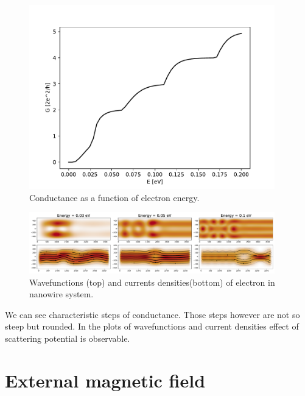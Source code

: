 \documentclass[12pt, a4paper]{article}
\begin{document}
\newpage
\begin{figure}[h]
    \begin{center}
        \includegraphics[width=0.95\textwidth]{../plots/condutance.pdf}
    \end{center}
    \caption{Conductance as a function of electron energy.}
    \label{fig:ex1_conductance}
\end{figure}

\begin{figure}[H]
    \begin{center}
        \includegraphics[width=0.95\textwidth]{../plots/wavefunctions_currents.pdf}
    \end{center}
    \caption{Wavefunctions (top) and currents densities(bottom) of electron in nanowire system.}
    \label{fig:ex1_wavefunctions}
\end{figure}

We can see characteristic steps of conductance.
Those steps however are not so steep but rounded.
In the plots of wavefunctions and current densities effect of scattering potential is observable.

\section*{External magnetic field}
\end{document}
